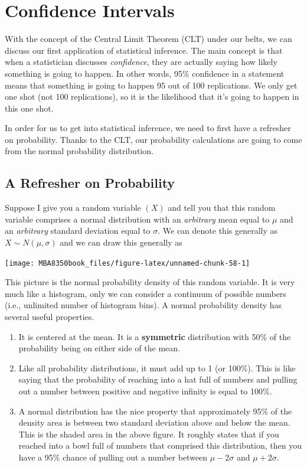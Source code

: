 \documentclass[
]{book}
\begin{document}
\hypertarget{CI}{%
\chapter{Confidence Intervals}\label{CI}}

With the concept of the Central Limit Theorem (CLT) under our belts, we can discuss our first application of statistical inference. The main concept is that when a statistician discusses \emph{confidence}, they are actually saying how likely something is going to happen. In other words, 95\% confidence in a statement means that something is going to happen 95 out of 100 replications. We only get one shot (not 100 replications), so it is the likelihood that it's going to happen in this one shot.

In order for us to get into statistical inference, we need to first have a refresher on probability. Thanks to the CLT, our probability calculations are going to come from the normal probability distribution.

\hypertarget{a-refresher-on-probability}{%
\section{A Refresher on Probability}\label{a-refresher-on-probability}}

Suppose I give you a random variable \((X)\) and tell you that this random variable comprises a normal distribution with an \emph{arbitrary} mean equal to \(\mu\) and an \emph{arbitrary} standard deviation equal to \(\sigma\). We can denote this generally as \(X \sim N(\mu,\sigma)\) and we can draw this generally as

\begin{center}\texttt{[image: MBA8350book\_files/figure-latex/unnamed-chunk-58-1]} \end{center}

This picture is the normal probability density of this random variable. It is very much like a histogram, only we can consider a continuum of possible numbers (i.e., unlimited number of histogram bins). A normal probability density has several useful properties.

\begin{enumerate}
\def\labelenumi{\arabic{enumi}.}
\item
  It is centered at the mean. It is a \textbf{symmetric} distribution with 50\% of the probability being on either side of the mean.
\item
  Like all probability distributions, it must add up to 1 (or 100\%). This is like saying that the probability of reaching into a hat full of numbers and pulling out a number between positive and negative infinity is equal to 100\%.
\item
  A normal distribution has the nice property that approximately 95\% of the density area is between two standard deviation above and below the mean. This is the shaded area in the above figure. It roughly states that if you reached into a bowl full of numbers that comprised this distribution, then you have a 95\% chance of pulling out a number between \(\mu-2\sigma\) and \(\mu+2\sigma\).
\end{enumerate}
\end{document}
